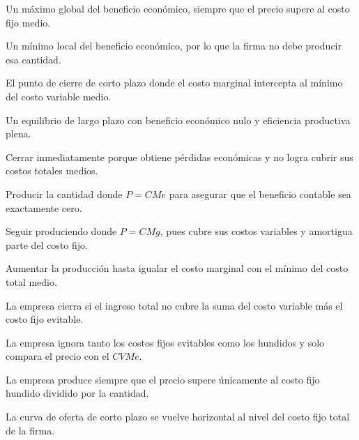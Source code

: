\begin{opts}
    \item Un máximo global del beneficio económico, siempre que el precio supere al costo fijo medio.
    \item Un mínimo local del beneficio económico, por lo que la firma no debe producir esa cantidad.
    \item El punto de cierre de corto plazo donde el costo marginal intercepta al mínimo del costo variable medio.
    \item Un equilibrio de largo plazo con beneficio económico nulo y eficiencia productiva plena.
\end{opts}

\begin{opts}
    \item Cerrar inmediatamente porque obtiene pérdidas económicas y no logra cubrir sus costos totales medios.
    \item Producir la cantidad donde $P = CMe$ para asegurar que el beneficio contable sea exactamente cero.
    \item Seguir produciendo donde $P = CMg$, pues cubre sus costos variables y amortigua parte del costo fijo.
    \item Aumentar la producción hasta igualar el costo marginal con el mínimo del costo total medio.
\end{opts}

\begin{opts}
    \item La empresa cierra si el ingreso total no cubre la suma del costo variable más el costo fijo evitable.
    \item La empresa ignora tanto los costos fijos evitables como los hundidos y solo compara el precio con el $CVMe$.
    \item La empresa produce siempre que el precio supere únicamente al costo fijo hundido dividido por la cantidad.
    \item La curva de oferta de corto plazo se vuelve horizontal al nivel del costo fijo total de la firma.
\end{opts}

